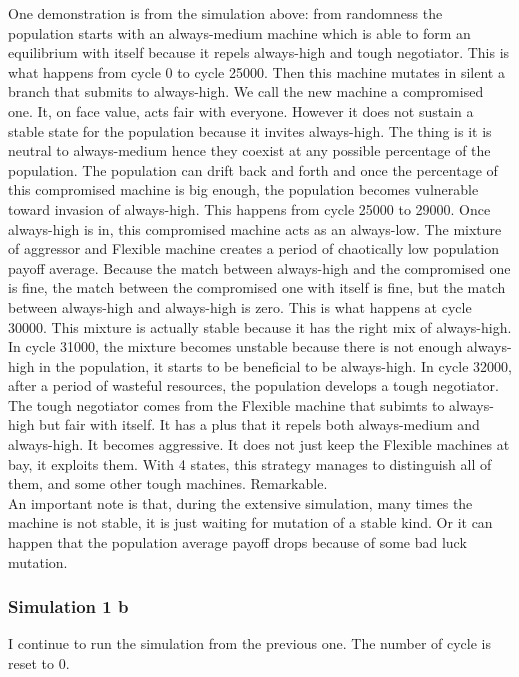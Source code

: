 \documentclass[12.5pt]{report}
\begin{document}
One demonstration is from the simulation above: from randomness the population starts with an always-medium machine which is able to form an equilibrium with itself because it repels always-high and tough negotiator. This is what happens from cycle 0 to cycle 25000. Then this machine mutates in silent a branch that submits to always-high. We call the new machine a compromised one. It, on face value, acts fair with everyone. However it does not sustain a stable state for the population because it invites always-high. The thing is it is neutral to always-medium hence they coexist at any possible percentage of the population. The population can drift back and forth and once the percentage of this compromised machine is big enough, the population becomes vulnerable toward invasion of always-high. This happens from cycle 25000 to 29000. Once always-high is in, this compromised machine acts as an always-low. The mixture of aggressor and Flexible machine creates a period of chaotically low population payoff average. Because the match between always-high and the compromised one is fine, the match between the compromised one with itself is fine, but the match between always-high and always-high is zero. This is what happens at cycle 30000. This mixture is actually stable because it has the right mix of always-high. In cycle 31000, the mixture becomes unstable because there is not enough always-high in the population, it starts to be beneficial to be always-high. In cycle 32000, after a period of wasteful resources, the population develops a tough negotiator. The tough negotiator comes from the Flexible machine that subimts to always-high but fair with itself. It has a plus that it repels both always-medium and always-high. It becomes aggressive. It does not just keep the Flexible machines at bay, it exploits them. With 4 states, this strategy manages to distinguish all of them, and some other tough machines. Remarkable.\\

An important note is that, during the extensive simulation, many times the machine is not stable, it is just waiting for mutation of a stable kind. Or it can happen that the population average payoff drops because of some bad luck mutation.\\


\subsubsection{Simulation 1 b}

I continue to run the simulation from the previous one. The number of cycle is reset to 0.
\end{document}
